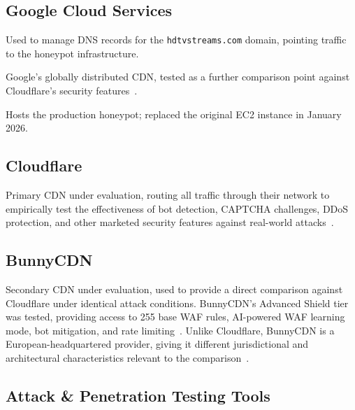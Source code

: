 \documentclass[12pt, a4paper]{report}   %
\begin{document}
\subsection{Google Cloud Services}

\begin{description}[leftmargin=3cm, style=nextline]

  \item[Cloud Domains]
    Used to manage DNS records for the \texttt{hdtvstreams.com} domain, pointing
    traffic to the honeypot infrastructure.

  \item[Cloud CDN]
    Google's globally distributed CDN, tested as a further comparison point against
    Cloudflare's security features~\cite{cf-how-works}.

  \item[Compute Engine (GCP VM)]
    Hosts the production honeypot; replaced the original EC2 instance in January 2026.

\end{description}

\subsection{Cloudflare}

Primary CDN under evaluation, routing all traffic through their network to
empirically test the effectiveness of bot detection, CAPTCHA challenges, DDoS
protection, and other marketed security features against real-world 
attacks~\cite{cf-how-works,cf-ddos,cf-bot-fight}.

\subsection{BunnyCDN}
Secondary CDN under evaluation, used to provide a direct comparison against
Cloudflare under identical attack conditions. BunnyCDN's Advanced Shield tier
was tested, providing access to 255 base WAF rules, AI-powered WAF learning
mode, bot mitigation, and rate limiting~\cite{bunny-shield}. Unlike
Cloudflare, BunnyCDN is a European-headquartered provider, giving it
different jurisdictional and architectural characteristics relevant to the
comparison~\cite{bunny-cdn-eu}.

\subsection{Attack \& Penetration Testing Tools}
\end{document}
